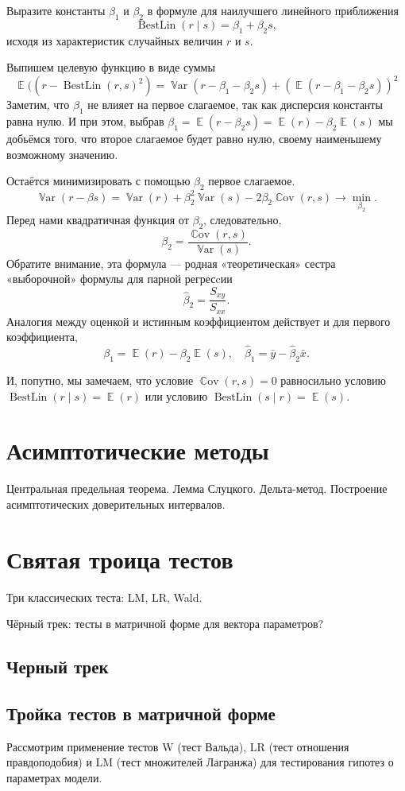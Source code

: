 \documentclass[12pt]{article}
\DeclareMathOperator{\Cov}{\mathbb{C}ov}
\DeclareMathOperator{\Var}{\mathbb{V}ar}
\DeclareMathOperator{\BestLin}{BestLin}
\DeclareMathOperator{\E}{\mathbb{E}}
\newcommand{\hb}{\hat{\beta}}
\begin{document}
\begin{problem}
Выразите константы $\beta_1$ и $\beta_2$ в формуле для наилучшего линейного приближения 
\[
\BestLin(r \mid s) = \beta_1 + \beta_2 s,
\]
исходя из характеристик случайных величин $r$ и $s$. 

\begin{sol}
Выпишем целевую функцию в виде суммы
\[
    \E((r - \BestLin(r, s)^2)  = \Var(r - \beta_1- \beta_2 s) + (\E(r - \beta_1 - \beta_2 s))^2
\]
Заметим, что $\beta_1$ не влияет на первое слагаемое, так как дисперсия константы равна нулю.
И при этом, выбрав $\beta_1 = \E(r - \beta_2 s) = \E(r) - \beta_2\E(s)$ мы добьёмся того, что второе слагаемое будет равно нулю, своему наименьшему возможному значению. 

Остаётся минимизировать с помощью $\beta_2$ первое слагаемое. 
\[
\Var(r - \beta s) = \Var(r) + \beta_2^2 \Var(s) - 2 \beta_2 \Cov(r, s) \to \min_{\beta_2}.
\]
Перед нами квадратичная функция от $\beta_2$, следовательно, 
\[
\beta_2 = \frac{\Cov(r, s)}{ \Var(s)}.
\]
Обратите внимание, эта формула — родная «теоретическая» сестра «выборочной» формулы для парной регресcии
\[
\hb_2 = \frac{S_{xy}}{S_{xx}}.
\]
Аналогия между оценкой и истинным коэффициентом действует и для первого коэффициента,
\[
\beta_1 = \E(r) - \beta_2 \E(s), \quad  \hb_1 = \bar y - \hb_2 \bar x.
\]

И, попутно, мы замечаем, что условие $\Cov(r, s) = 0$ равносильно условию  $\BestLin(r \mid s) = \E(r)$ или условию $\BestLin(s \mid r) = \E(s)$.
\end{sol}
\end{problem}



\section{Асимптотические методы}
Центральная предельная теорема. Лемма Слуцкого. Дельта-метод. Построение асимптотических доверительных интервалов.


\section{Святая троица тестов}
Три классических теста: LM, LR, Wald.


Чёрный трек: тесты в матричной форме для вектора параметров?
\subsection{Черный трек}
\subsection{Тройка тестов в матричной форме}
Рассмотрим применение тестов W  (тест Вальда), LR (тест отношения правдоподобия) и LM (тест множителей Лагранжа) для тестирования гипотез о параметрах модели.
\end{document}
